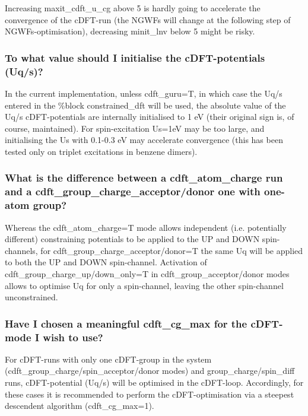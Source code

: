 \documentclass[letterpaper,10pt,english]{sphinxmanual}
\begin{document}
Increasing maxit\_cdft\_u\_cg above 5 is hardly going to accelerate the
convergence of the cDFT-run (the NGWFs will change at the following step
of NGWFs-optimisation), decreasing minit\_lnv below 5 might be risky.


\subsubsection{To what value should I initialise the cDFT-potentials (Uq/s)?}
\label{\detokenize{cDFT:to-what-value-should-i-initialise-the-cdft-potentials-uq-s}}
In the current implementation, unless cdft\_guru=T, in which case the
Uq/s entered in the \%block constrained\_dft will be used, the absolute
value of the Uq/s cDFT-potentials are internally initialised to 1 eV
(their original sign is, of course, maintained). For spin-excitation
\textbar{}Us\textbar{}=1eV may be too large, and initialising the \textbar{}Us\textbar{} with 0.1-0.3 eV
may accelerate convergence (this has been tested only on triplet
excitations in benzene dimers).


\subsubsection{What is the difference between a cdft\_atom\_charge run and a cdft\_group\_charge\_acceptor/donor one with one-atom group?}
\label{\detokenize{cDFT:what-is-the-difference-between-a-cdft-atom-charge-run-and-a-cdft-group-charge-acceptor-donor-one-with-one-atom-group}}
Whereas the cdft\_atom\_charge=T mode allows independent (i.e.
potentially different) constraining potentials to be applied to the UP
and DOWN spin-channels, for 
cdft\_group\_charge\_acceptor/donor=T the same Uq will be applied to
both the UP and DOWN spin-channel. Activation of
cdft\_group\_charge\_up/down\_only=T in cdft\_group\_acceptor/donor
modes allows to optimise Uq for only a spin-channel, leaving the other
spin-channel unconstrained.


\subsubsection{Have I chosen a meaningful cdft\_cg\_max for the cDFT-mode I wish to use?}
\label{\detokenize{cDFT:have-i-chosen-a-meaningful-cdft-cg-max-for-the-cdft-mode-i-wish-to-use}}
For cDFT-runs with only one cDFT-group in the system
(cdft\_group\_charge/spin\_acceptor/donor modes) and
group\_charge/spin\_diff runs,  cDFT-potential (Uq/s) will
be optimised in the cDFT-loop. Accordingly, for these cases it is
recommended to perform the cDFT-optimisation via a steepest descendent
algorithm (cdft\_cg\_max=1).
\end{document}
